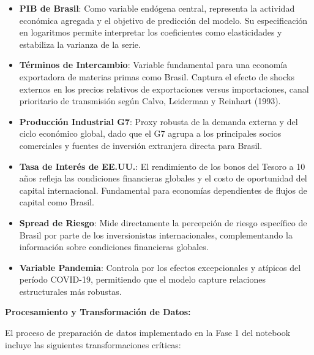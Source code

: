 \documentclass[3p,11pt]{elsarticle}
\begin{document}
\begin{itemize}
    \item \textbf{PIB de Brasil}: Como variable endógena central, representa la actividad económica agregada y el objetivo de predicción del modelo. Su especificación en logaritmos permite interpretar los coeficientes como elasticidades y estabiliza la varianza de la serie.
    
    \item \textbf{Términos de Intercambio}: Variable fundamental para una economía exportadora de materias primas como Brasil. Captura el efecto de shocks externos en los precios relativos de exportaciones versus importaciones, canal prioritario de transmisión según Calvo, Leiderman y Reinhart (1993).
    
    \item \textbf{Producción Industrial G7}: Proxy robusta de la demanda externa y del ciclo económico global, dado que el G7 agrupa a los principales socios comerciales y fuentes de inversión extranjera directa para Brasil.
    
    \item \textbf{Tasa de Interés de EE.UU.}: El rendimiento de los bonos del Tesoro a 10 años refleja las condiciones financieras globales y el costo de oportunidad del capital internacional. Fundamental para economías dependientes de flujos de capital como Brasil.
    
    \item \textbf{Spread de Riesgo}: Mide directamente la percepción de riesgo específico de Brasil por parte de los inversionistas internacionales, complementando la información sobre condiciones financieras globales.
    
    \item \textbf{Variable Pandemia}: Controla por los efectos excepcionales y atípicos del período COVID-19, permitiendo que el modelo capture relaciones estructurales más robustas.
\end{itemize}

\textbf{Procesamiento y Transformación de Datos:}

El proceso de preparación de datos implementado en la Fase 1 del notebook incluye las siguientes transformaciones críticas:
\end{document}
